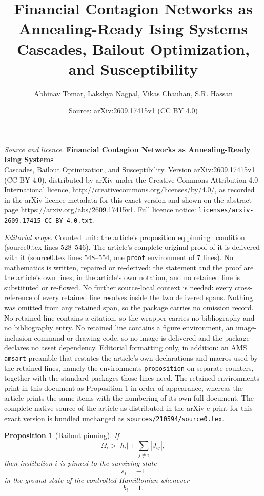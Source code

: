 \documentclass[10pt,a4paper]{amsart}
\title{\textbf{Financial Contagion Networks as Annealing-Ready Ising Systems}\\[0.3em] \large Cascades, Bailout Optimization, and Susceptibility}
\author{Abhinav Tomar, Lakshya Nagpal, Vikas Chauhan, S.R. Hassan}
\date{Source: arXiv:2609.17415v1 (CC BY 4.0)}
\newtheorem{proposition}{Proposition}
\begin{document}
\maketitle

\noindent\emph{Source and licence.} \textbf{Financial Contagion Networks as Annealing-Ready Ising Systems}\\[0.3em] \large Cascades, Bailout Optimization, and Susceptibility. Version arXiv:2609.17415v1 (CC BY 4.0), distributed by arXiv under the Creative Commons Attribution 4.0 International licence, http://creativecommons.org/licenses/by/4.0/, as recorded in the arXiv licence metadata for this exact version and shown on the abstract page https://arxiv.org/abs/2609.17415v1. Full licence notice: \texttt{licenses/arxiv-2609.17415-CC-BY-4.0.txt}.\par\smallskip

\noindent\textit{Editorial scope.} Counted unit: the article's proposition eq:pinning\_condition (source0.tex lines 528--546). The article's complete original proof of it is delivered with it (source0.tex lines 548--554, one \texttt{proof} environment of 7 lines). No mathematics is written, repaired or re-derived: the statement and the proof are the article's own lines, in the article's own notation, and no retained line is substituted or re-flowed.  No further source-local context is needed: every cross-reference of every retained line resolves inside the two delivered spans.  Nothing was omitted from any retained span, so the package carries no omission record.  No retained line contains a citation, so the wrapper carries no bibliography and no bibliography entry.  No retained line contains a figure environment, an image-inclusion command or drawing code, so no image is delivered and the package declares no asset dependency.  Editorial formatting only, in addition: an AMS \texttt{amsart} preamble that restates the article's own declarations and macros used by the retained lines, namely the environments \texttt{proposition} on separate counters, together with the standard packages those lines need.  The retained environments print in this document as Proposition 1 in order of appearance, whereas the article prints the same items with the numbering of its own full document.  The complete native source of the article as distributed in the arXiv e-print for this exact version is bundled unchanged as \texttt{sources/210594/source0.tex}.
\begin{proposition}[Bailout pinning]
If
\begin{equation}
\Omega_i
>
|h_i|
+
\sum_{j\neq i}|J_{ij}|,
\label{eq:pinning_condition}
\end{equation}
then institution $i$ is pinned to the surviving state
\begin{equation}
s_i=-1
\end{equation}
in the ground state of the controlled Hamiltonian whenever
\begin{equation}
b_i=1.
\end{equation}
\end{proposition}
\end{document}
